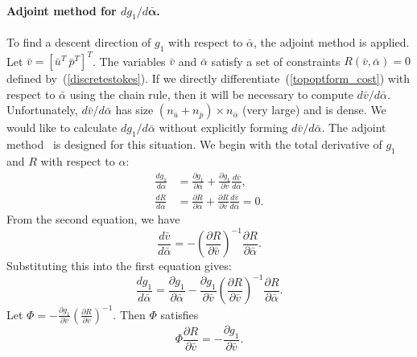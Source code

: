 \documentclass[times]{fldauth}
\begin{document}
\paragraph{Adjoint method for $d g_1/d \mathbf{\bar{\alpha}} $.}
To find a descent direction of $g_1$ with respect to $\bar{\alpha}$,
the adjoint method \cite{Jameson1999} is applied. Let $\bar{v} =
[\bar{u}^T\ \bar{p}^T]^T$. The variables $\bar{v}$ and $\bar{\alpha}$
satisfy a set of constraints $R(\bar{v},\bar{\alpha})=0$ defined
by~(\ref{discretestokes}). If we directly
differentiate~(\ref{topoptform_cost}) with respect to $\bar{\alpha}$
using the chain rule, then it will be necessary to compute
$d\bar{v}/d\bar{\alpha}$. Unfortunately, $d\bar{v}/d\bar{\alpha}$ has
size $(n_{\bar{u}}+n_{\bar{p}}) \times n_{\bar{\alpha}}$ (very large)
and is dense. We would like to calculate $d g_1/d\bar{\alpha}$ without
explicitly forming $d\bar{v}/d\bar{\alpha}$. The adjoint
method~\cite{Errico1997} is designed for this situation. We begin with the
total derivative of $g_1$ and $R$ with respect to $\alpha$:
\begin{align*}
  \frac{dg_1}{d\bar{\alpha}} &=
  \frac{\partial{g_1}}{\partial{\bar{\alpha}}}+
  \frac{\partial{g_1}}{\partial{\bar{v}}} \frac{d\bar{v}}{d\bar{\alpha}},\\
  \frac{dR}{d\bar{\alpha}} &=
  \frac{\partial{R}}{\partial{\bar{\alpha}}}+
  \frac{\partial{R}}{\partial{\bar{v}}}
  \frac{d\bar{v}}{d\bar{\alpha}}=0.
\end{align*}
From the second equation, we have
\begin{equation*}
  \frac{d\bar{v}}{d\bar{\alpha}}
  = -\left(\frac{\partial{R}}{\partial{\bar{v}}}\right)^{-1}
  \frac{\partial{R}}{\partial{\bar{\alpha}}}.
\end{equation*}
Substituting this into the first equation gives:
\begin{equation*}
   \frac{dg_1}{d\bar{\alpha}}
   = \frac{\partial{g_1}}{\partial{\bar{\alpha}}}
   -\frac{\partial{g_1}}{\partial{\bar{v}}}
   \left(\frac{\partial{R}}{\partial{\bar{v}}}\right)^{-1}
   \frac{\partial{R}}{\partial{\bar{\alpha}}}.
\end{equation*}
Let $\Phi = -\frac{\partial{g_1}}{\partial{\bar{v}}}
\left(\frac{\partial{R}}{\partial{\bar{v}}}\right)^{-1}$. Then
$\Phi$ satisfies
\begin{equation}
\label{adjointeq}
 \Phi \frac{\partial{R}}{\partial{\bar{v}}}
 = -{\frac{\partial{g_1}}{\partial{\bar{v}}}}.
\end{equation}
\end{document}
